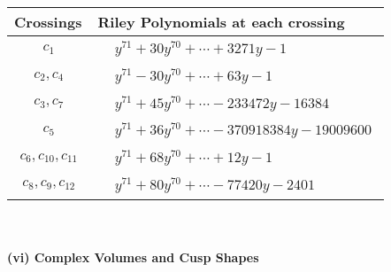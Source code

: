 \documentclass[1p]{elsarticle_modified}
\theoremstyle{definition}
\begin{document}
\begin{tabular}{m{50pt}|m{274pt}}
Crossings & \hspace{64pt}Riley Polynomials at each crossing \\
\hline $$\begin{aligned}c_{1}\end{aligned}$$&$\begin{aligned}
&y^{71}+30 y^{70}+\cdots+3271 y-1
\end{aligned}$\\
\hline $$\begin{aligned}c_{2},c_{4}\end{aligned}$$&$\begin{aligned}
&y^{71}-30 y^{70}+\cdots+63 y-1
\end{aligned}$\\
\hline $$\begin{aligned}c_{3},c_{7}\end{aligned}$$&$\begin{aligned}
&y^{71}+45 y^{70}+\cdots-233472 y-16384
\end{aligned}$\\
\hline $$\begin{aligned}c_{5}\end{aligned}$$&$\begin{aligned}
&y^{71}+36 y^{70}+\cdots-370918384 y-19009600
\end{aligned}$\\
\hline $$\begin{aligned}c_{6},c_{10},c_{11}\end{aligned}$$&$\begin{aligned}
&y^{71}+68 y^{70}+\cdots+12 y-1
\end{aligned}$\\
\hline $$\begin{aligned}c_{8},c_{9},c_{12}\end{aligned}$$&$\begin{aligned}
&y^{71}+80 y^{70}+\cdots-77420 y-2401
\end{aligned}$\\
\hline
\end{tabular}\\~\\
\newpage\flushleft \textbf{(vi) Complex Volumes and Cusp Shapes}
\end{document}
